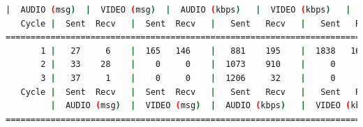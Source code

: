 \begin{lstlisting}[language=bash,basicstyle=\ttfamily\tiny]
         |  AUDIO (msg)  |  VIDEO (msg)  |  AUDIO (kbps)   |  VIDEO (kbps)   |     CPU (%) 
   Cycle |  Sent  Recv   |  Sent  Recv   |   Sent   Recv   |   Sent   Recv   | Program System
================================================================================================
       1 |   27     6    |  165   146    |   881    195    |  1838   1628    |  36      0       
       2 |   33    28    |    0     0    |  1073    910    |     0      0    |  41     75       
       3 |   37     1    |    0     0    |  1206     32    |     0      0    |  51     74       
   Cycle |  Sent  Recv   |  Sent  Recv   |   Sent   Recv   |   Sent   Recv   | Program System
         |  AUDIO (msg)  |  VIDEO (msg)  |  AUDIO (kbps)   |  VIDEO (kbps)   |     CPU (%) 
===========================================================================================
\end{lstlisting}


